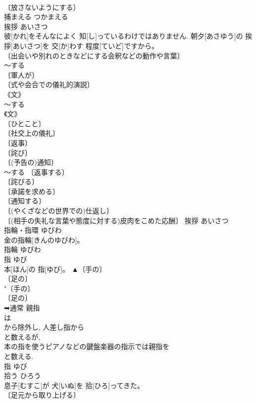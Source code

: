 \documentclass[8pt]{extreport}
\begin{document}
\begin{CJK}{UTF8}{min}
\\	〔放さないようにする〕 
\\	捕まえる	つかまえる	
\\	挨拶	あいさつ	
\\	彼[かれ]をそんなによく 知[し]っているわけではありません. 朝夕[あさゆう]の 挨拶[あいさつ]を 交[か]わす 程度[ていど]ですから。	
\\	〔出会いや別れのときなどにする会釈などの動作や言葉〕 
\\	～する 
\\	〔軍人が〕 
\\	〔式や会合での儀礼的演説〕 
\\	《文》 
\\	～する 
\\	《文》 
\\	〔ひとこと〕 
\\	〔社交上の儀礼〕 
\\	〔返事〕 
\\	〔詫び〕 
\\	〔(予告の)通知〕 
\\	～する 〔返事する〕 
\\	〔詫びる〕 
\\	〔承諾を求める〕 
\\	〔通知する〕 
\\	〔(やくざなどの世界での)仕返し〕 
\\	〔(相手の失礼な言葉や態度に対する)皮肉をこめた応酬〕	挨拶	あいさつ	
\\	指輪・指環	ゆびわ	
\\	金の指輪[きんのゆびわ]。	
\\	指輪	ゆびわ	
\\	指	ゆび	
\\	本[ほん]の 指[ゆび]。	▲〔手の〕 
\\	〔足の〕 
\\	"〔手の〕 
\\	〔足の〕 
\\	➡通常 親指 
\\	は 
\\	から除外し, 人差し指から 
\\	と数えるが, 
\\	本の指を使うピアノなどの鍵盤楽器の指示では親指を 
\\	と数える.
\\	指	ゆび	
\\	拾う	ひろう	
\\	息子[むすこ]が 犬[いぬ]を 拾[ひろ]ってきた。	
\\	〔足元から取り上げる〕 

\end{CJK}
\end{document}
